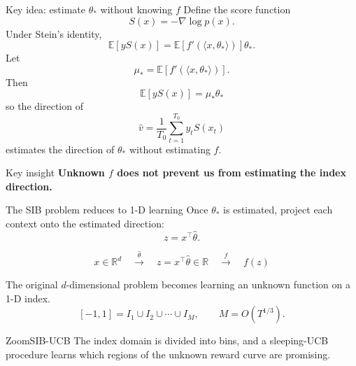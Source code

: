 \documentclass[11pt]{beamer}
\begin{document}
\begin{frame}{Key idea: estimate $\theta_*$ without knowing $f$}
\small
Define the score function
\[
S(x)=-\nabla\log p(x).
\]
Under Stein's identity,
\[
\mathbb{E}[yS(x)]=\mathbb{E}\!\left[f'(\langle x,\theta_*\rangle)\right]\theta_*.
\]
Let
\[
\mu_*=\mathbb{E}\!\left[f'(\langle x,\theta_*\rangle)\right].
\]
Then
\[
\boxed{\mathbb{E}[yS(x)]=\mu_*\theta_*}
\]
so the direction of
\[
\boxed{\hat v=\frac{1}{T_0}\sum_{t=1}^{T_0}y_tS(x_t)}
\]
estimates the direction of $\theta_*$ without estimating $f$.
\begin{block}{Key insight}
\centering
\textbf{Unknown $f$ does not prevent us from estimating the index direction.}
\end{block}
\end{frame}

\begin{frame}{The SIB problem reduces to 1-D learning}
\small
Once $\theta_*$ is estimated, project each context onto the estimated direction:
\[
z=x^\top\hat\theta.
\]
\begin{center}
\[
x\in\mathbb{R}^d\quad\xrightarrow{\ \hat\theta\ }\quad z=x^\top\hat\theta\in\mathbb{R}\quad\xrightarrow{\ f\ }\quad f(z)
\]
\end{center}
The original $d$-dimensional problem becomes learning an unknown function on a 1-D index.
\[
[-1,1]=I_1\cup I_2\cup\cdots\cup I_M,\qquad M=O(T^{1/3}).
\]
\begin{block}{ZoomSIB-UCB}
The index domain is divided into bins, and a sleeping-UCB procedure learns which regions of the unknown reward curve are promising.
\end{block}
\end{frame}

\end{document}
